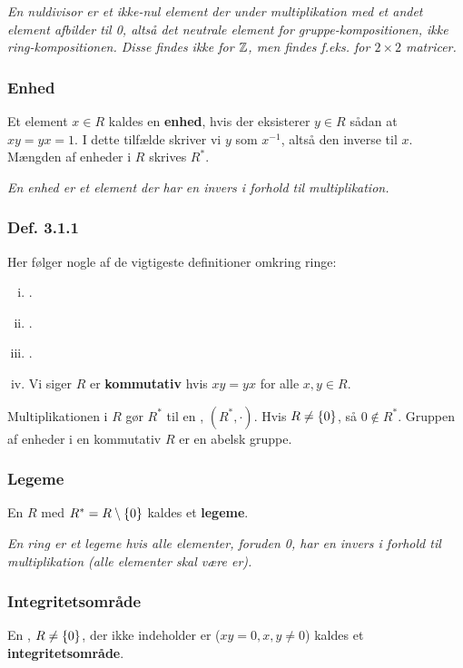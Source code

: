 \textit{En nuldivisor er et ikke-nul element der under multiplikation med et
andet element afbilder til 0, altså det neutrale element for
gruppe-kompositionen, ikke ring-kompositionen. Disse findes ikke for $\mathbb{Z}$, men
findes f.eks. for $2\times2$ matricer.}

\subsubsection{Enhed}
\label{Enhed}
Et element $x \in R$ kaldes en \textbf{enhed}, hvis der eksisterer $y \in R$
sådan at $xy = yx = 1$. I dette tilfælde skriver vi $y$ som $x^{-1}$, altså den
inverse til $x$. Mængden af enheder i $R$ skrives $R^*$.

\textit{En enhed er et element der har en invers i forhold til multiplikation.}

\subsubsection{Def. 3.1.1}
\label{Def. 3.1.1}
Her følger nogle af de vigtigeste definitioner omkring ringe:
\begin{enumerate}[(i)]
  \item {}.
  \item {}.
  \item {}.
  \item Vi siger $R$ er \textbf{kommutativ} hvis $xy = yx$ for alle $x, y \in
  R$.
\end{enumerate}

Multiplikationen i $R$ gør $R^*$ til en , $(R^*, \cdot)$. Hvis
$R \neq \{ 0 \}$, så $0 \nin R^*$. Gruppen af enheder i en kommutativ
 $R$ er en abelsk gruppe.

\subsubsection{Legeme}
\label{Legeme}
En  $R$ med $R^* = R\setminus \{ 0 \}$ kaldes et
\textbf{legeme}.

\textit{En ring er et legeme hvis alle elementer, foruden 0, har en invers i
forhold til multiplikation (alle elementer skal være er).}

\subsubsection{Integritetsområde}
\label{Integritetsomraade}
En , $R \neq \{ 0 \}$, der ikke indeholder
er ($xy = 0, x, y \neq 0$) kaldes et
\textbf{integritetsområde}.

